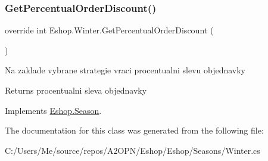 \subsubsection{\texorpdfstring{GetPercentualOrderDiscount()}{GetPercentualOrderDiscount()}}
{\footnotesize\ttfamily override int Eshop.\+Winter.\+Get\+Percentual\+Order\+Discount (\begin{DoxyParamCaption}{ }\end{DoxyParamCaption})\hspace{0.3cm}{\ttfamily [virtual]}}



Na zaklade vybrane strategie vraci procentualni slevu objednavky 

\begin{DoxyReturn}{Returns}
procentualni sleva objednavky
\end{DoxyReturn}


Implements \mbox{\hyperlink{class_eshop_1_1_season}{Eshop.\+Season}}.



The documentation for this class was generated from the following file\+:\begin{DoxyCompactItemize}
\item 
C\+:/\+Users/\+Me/source/repos/\+A2\+O\+P\+N/\+Eshop/\+Eshop/\+Seasons/Winter.\+cs\end{DoxyCompactItemize}
